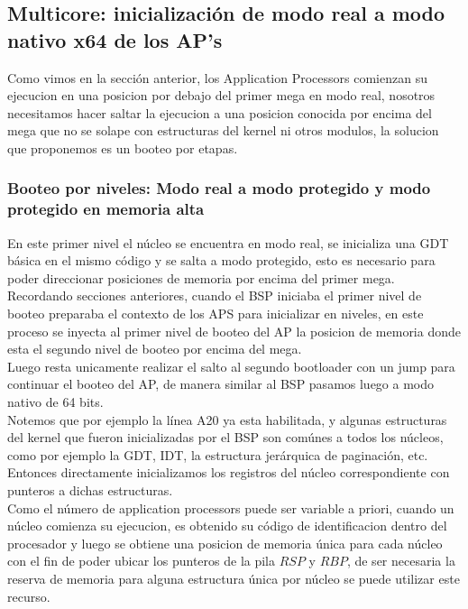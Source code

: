 \subsection{Multicore: inicialización de modo real a modo nativo x64 de los AP's}
    Como vimos en la sección anterior, los Application Processors comienzan su ejecucion en una posicion por debajo del primer mega en modo real, nosotros necesitamos hacer saltar la ejecucion a una posicion conocida por encima del mega que no se solape con estructuras del kernel ni otros modulos, la solucion que proponemos es un booteo por etapas.
    
    \subsubsection{Booteo por niveles: Modo real a modo protegido y modo protegido en memoria alta}
    En este primer nivel el núcleo se encuentra en modo real, se inicializa una GDT básica en el mismo código y se salta a modo protegido, esto es necesario para poder direccionar posiciones de memoria por encima del primer mega.\\

    Recordando secciones anteriores, cuando el BSP iniciaba el primer nivel de booteo preparaba el contexto de los APS para inicializar en niveles, en este proceso se inyecta al primer nivel de booteo del AP la posicion de memoria donde esta el segundo nivel de booteo por encima del mega.\\

    Luego resta unicamente realizar el salto al segundo bootloader con un jump para continuar el booteo del AP, de manera similar al BSP pasamos luego a modo nativo de 64 bits.\\
    Notemos que por ejemplo la línea A20 ya esta habilitada, y algunas estructuras del kernel que fueron inicializadas por el BSP son comúnes a todos los núcleos, como por ejemplo la GDT, IDT, la estructura jerárquica de paginación, etc.\\
    Entonces directamente inicializamos los registros del núcleo correspondiente con punteros a dichas estructuras.
    \\

    Como el número de application processors puede ser variable a priori, cuando un núcleo comienza su ejecucion, es obtenido su código de identificacion dentro del procesador y luego se obtiene una posicion de memoria única para cada núcleo con el fin de poder ubicar los punteros de la pila $RSP$ y $RBP$, de ser necesaria la reserva de memoria para alguna estructura única por núcleo se puede utilizar este recurso.